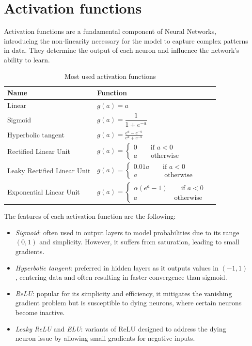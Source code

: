 \section{Activation functions}

Activation functions are a fundamental component of Neural Networks, introducing the non-linearity necessary for the model to capture complex patterns in data.
They determine the output of each neuron and influence the network's ability to learn.
\renewcommand*{\arraystretch}{2}
\begin{table}[H]
    \centering
    \begin{tabular}{|l|l|l|}
    \hline
    \textbf{Name}      & \textbf{Function}  \\ \hline
    Linear             &  $g(a)=a$                 \\ \hline
    Sigmoid            &  $g(a)=\dfrac{1}{1+e^{-a}}$            \\ \hline
    Hyperbolic tangent & $g(a)=\frac{e^a-e^{-a}}{e^a+e^{-a}}$                  \\ \hline
    Rectified Linear Unit & $g(a)=\begin{cases} 0 \qquad \text{if }a<0 \\ a \qquad \text{otherwise}\end{cases}$  \\ \hline
    Leaky Rectified Linear Unit & $g(a)=\begin{cases} 0.01a \qquad \text{if }a<0 \\ a \qquad\qquad \text{otherwise}\end{cases}$  \\ \hline
    Exponential Linear Unit & $g(a)=\begin{cases} \alpha(e^a-1) \qquad \text{if }a<0 \\ a \qquad\qquad\quad\:\: \text{otherwise}\end{cases}$  \\ \hline
    \end{tabular}
    \caption{Most used activation functions}
\end{table}
\renewcommand*{\arraystretch}{1}
\noindent The features of each activation function are the following:
\begin{itemize}
    \item \textit{Sigmoid}: often used in output layers to model probabilities due to its range $(0, 1)$ and simplicity. 
        However, it suffers from saturation, leading to small gradients.
    \item \textit{Hyperbolic tangent}: preferred in hidden layers as it outputs values in $(-1, 1)$, centering data and often resulting in faster convergence than sigmoid.
    \item \textit{ReLU}: popular for its simplicity and efficiency, it mitigates the vanishing gradient problem but is susceptible to dying neurons, where certain neurons become inactive.
    \item \textit{Leaky ReLU} and \textit{ELU}: variants of ReLU designed to address the dying neuron issue by allowing small gradients for negative inputs.
\end{itemize}

